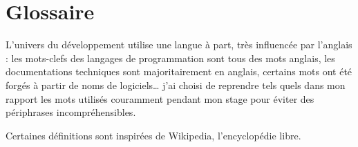 \chapter{Glossaire}

L'univers du développement utilise une langue à part, très influencée par l'anglais : les mots-clefs des langages de programmation sont tous des mots anglais, les documentations techniques sont majoritairement en anglais, certains mots ont été forgés à partir de noms de logiciels\dots{} j'ai choisi de reprendre tels quels dans mon rapport les mots utilisés couramment pendant mon stage pour éviter des périphrases incompréhensibles.

Certaines définitions sont inspirées de Wikipedia, l'encyclopédie libre.

